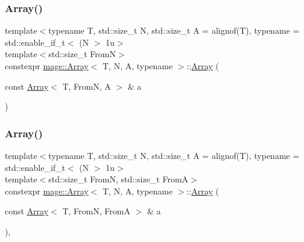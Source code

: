 \mbox{\label{structmage_1_1_array_a1e0a4b5cebb34709b32bc13e9ab917e1}} 
\subsubsection{\texorpdfstring{Array()}{Array()}\hspace{0.1cm}{\footnotesize\ttfamily [4/10]}}
{\footnotesize\ttfamily template$<$typename T, std\+::size\+\_\+t N, std\+::size\+\_\+t A = alignof(\+T), typename  = std\+::enable\+\_\+if\+\_\+t$<$ (\+N $>$ 1u$>$ \\
template$<$std\+::size\+\_\+t FromN$>$ \\
constexpr \mbox{\hyperlink{structmage_1_1_array}{mage\+::\+Array}}$<$ T, N, A, typename $>$\+::\mbox{\hyperlink{structmage_1_1_array}{Array}} (\begin{DoxyParamCaption}\item[{const \mbox{\hyperlink{structmage_1_1_array}{Array}}$<$ T, FromN, A $>$ \&}]{a }\end{DoxyParamCaption})\hspace{0.3cm}{\ttfamily [noexcept]}}

\mbox{\label{structmage_1_1_array_ac747c6b1fad2e919e3370cbe6b2937f5}} 
\subsubsection{\texorpdfstring{Array()}{Array()}\hspace{0.1cm}{\footnotesize\ttfamily [5/10]}}
{\footnotesize\ttfamily template$<$typename T, std\+::size\+\_\+t N, std\+::size\+\_\+t A = alignof(\+T), typename  = std\+::enable\+\_\+if\+\_\+t$<$ (\+N $>$ 1u$>$ \\
template$<$std\+::size\+\_\+t FromN, std\+::size\+\_\+t FromA$>$ \\
constexpr \mbox{\hyperlink{structmage_1_1_array}{mage\+::\+Array}}$<$ T, N, A, typename $>$\+::\mbox{\hyperlink{structmage_1_1_array}{Array}} (\begin{DoxyParamCaption}\item[{const \mbox{\hyperlink{structmage_1_1_array}{Array}}$<$ T, FromN, FromA $>$ \&}]{a }\end{DoxyParamCaption})\hspace{0.3cm}{\ttfamily [explicit]}, {\ttfamily [noexcept]}}

